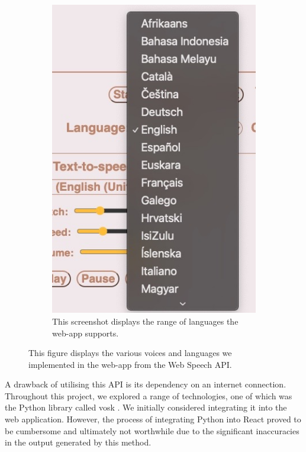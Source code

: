 \documentclass{l4proj}
\begin{document}
\begin{figure}
\begin{subfigure}[b]{0.3\textwidth}
        \includegraphics[width=\textwidth]{dissertation/images/languages.jpeg}
        \caption{This screenshot displays the range of languages the web-app supports.}
        \label{fig:languages}
    \end{subfigure}
    \caption{This figure displays the various voices and languages we implemented in the web-app from the Web Speech API.}
    \label{fig:voices-languages} 
\end{figure}

A drawback of utilising this API is its dependency on an internet connection. Throughout this project, we explored a range of technologies, one of which was the Python library called vosk \citep{PyPI}. We initially considered integrating it into the web application. However, the process of integrating Python into React proved to be cumbersome and ultimately not worthwhile due to the significant inaccuracies in the output generated by this method.
\end{document}
